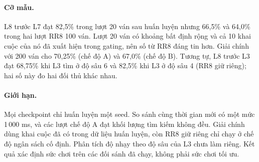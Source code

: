 \paragraph{Cỡ mẫu.} L8 trước L7 đạt 82{,}5\% trong lượt 20 ván sau huấn luyện nhưng 66{,}5\% và 64{,}0\% trong hai lượt RR8 100 ván. Lượt 20 ván có khoảng bất định rộng và cả 10 khai cuộc của nó đã xuất hiện trong gating, nên số từ RR8 đáng tin hơn. Giải chính với 200 ván cho 70{,}25\% (chế độ A) và 67{,}0\% (chế độ B). Tương tự, L8 trước L3 đạt 68{,}75\% khi L3 tìm ở độ sâu 6 và 82{,}5\% khi L3 ở độ sâu 4 (RR8 giữ riêng); hai số này đo hai đối thủ khác nhau.

\paragraph{Giới hạn.} Mọi checkpoint chỉ huấn luyện một seed. So sánh cùng thời gian mới có một mức 1\,000 ms, và các lượt chế độ A đạt khối lượng tìm kiếm không đều. Giải chính dùng khai cuộc đã có trong dữ liệu huấn luyện, còn RR8 giữ riêng chỉ chạy ở chế độ ngân sách cố định. Phân tích độ nhạy theo độ sâu của L3 chưa làm riêng. Kết quả xác định sức chơi trên các đối sánh đã chạy, không phải sức chơi tối ưu.

